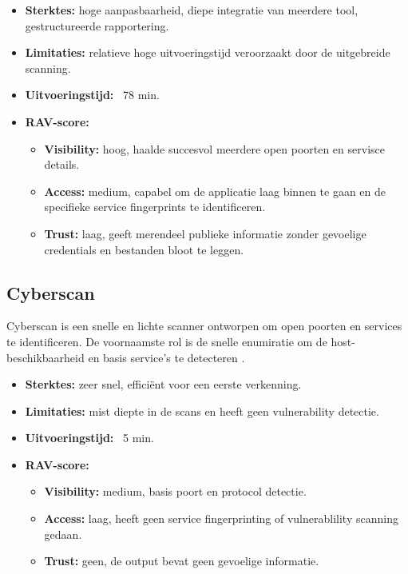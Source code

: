 \begin{itemize}
  \item \textbf{Sterktes:} hoge aanpasbaarheid, diepe integratie van meerdere tool, gestructureerde rapportering.
  \item \textbf{Limitaties:} relatieve hoge uitvoeringstijd veroorzaakt door de uitgebreide scanning.
  \item \textbf{Uitvoeringstijd:} ~78 min.
  \item \textbf{RAV-score:}
    {\small
    \begin{itemize}
      \item \textbf{Visibility:} hoog, haalde succesvol meerdere open poorten en servisce details. 
      \item \textbf{Access:} medium, capabel om de applicatie laag binnen te gaan en de specifieke service fingerprints te identificeren. 
      \item \textbf{Trust:} laag, geeft merendeel publieke informatie zonder gevoelige credentials en bestanden bloot te leggen. 
    \end{itemize}
    } 
\end{itemize}

\subsection{Cyberscan}

Cyberscan is een snelle en lichte scanner ontworpen om open poorten en services te identificeren. 
De voornaamste rol is de snelle enumiratie om de host-beschikbaarheid en basis service's te detecteren \autocite{Cyberscan}.

\begin{itemize}
  \item \textbf{Sterktes:} zeer snel, efficiënt voor een eerste verkenning.
  \item \textbf{Limitaties:} mist diepte in de scans en heeft geen vulnerability detectie.
  \item \textbf{Uitvoeringstijd:} ~5 min.
  \item \textbf{RAV-score:}
    \small{
    \begin{itemize}
      \item \textbf{Visibility:} medium, basis poort en protocol detectie.
      \item \textbf{Access:} laag, heeft geen service fingerprinting of vulnerablility scanning gedaan.
      \item \textbf{Trust:} geen, de output bevat geen gevoelige informatie. 
    \end{itemize}
    }
\end{itemize}

